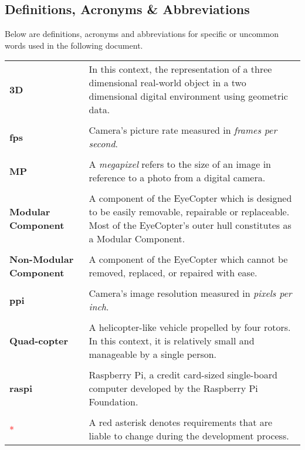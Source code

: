 \documentclass[10pt,letterpaper]{article}
\begin{document}
\newpage


\subsection{Definitions, Acronyms \& Abbreviations}
Below are definitions, acronyms and abbreviations for specific or uncommon words used in the following document. 
\begin{table}[ht]
  \begin{center}
    \begin{tabular}{p{4cm} p{8.5cm}}

        \textbf{3D} & In this context, the representation of a three dimensional real-world object in a two dimensional digital environment using geometric data. \\ \\
        
        \textbf{fps} & Camera's picture rate measured in \textit{frames per second}. \\ \\
        
        \textbf{MP} & A \textit{megapixel} refers to the size of an image in reference to a photo from a digital camera. \\ \\
        
        \textbf{Modular Component} & A component of the EyeCopter which is designed to be easily removable, repairable or replaceable. Most of the EyeCopter's outer hull constitutes as a Modular Component. \\ \\
        
        \textbf{Non-Modular Component} & A component of the EyeCopter which cannot be removed, replaced, or repaired with ease. \\ \\
        
        \textbf{ppi} & Camera's image resolution measured in \textit{pixels per inch}. \\ \\

        \textbf{Quad-copter} & A helicopter-like vehicle propelled by four rotors. In this context, it is relatively small and manageable by a single person. \\ \\
        
        \textbf{raspi} & Raspberry Pi, a credit card-sized single-board computer developed by the Raspberry Pi Foundation. \\ \\

        \textcolor{red}{*} & A red asterisk denotes requirements that are liable to change during the development process.

    \end{tabular}
  \end{center}
\end{table}
\end{document}
